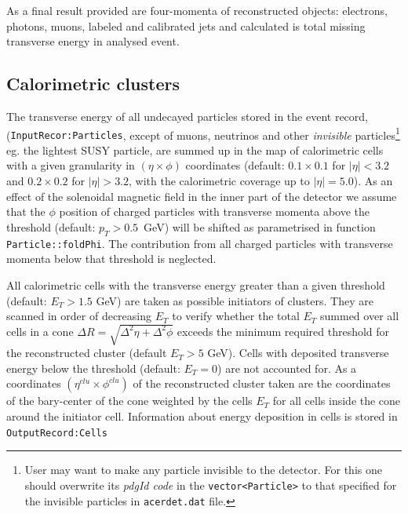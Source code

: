 As a final result provided are four-momenta of reconstructed objects:
electrons, photons, muons, labeled and calibrated jets and calculated is
total missing transverse energy in analysed event.


\boldmath 
\subsection{Calorimetric clusters}
\unboldmath

 The transverse energy of all undecayed particles stored in the event record,\newline
 ({\tt InputRecor:Particles}, except of muons, neutrinos and other 
 {\it invisible} particles\footnote{User may want to make any particle
 invisible to the detector. For this one should overwrite its {\it pdgId code} 
 in the  {\tt vector<Particle>} to that specified for the invisible particles 
 in {\tt acerdet.dat} file.} eg. the lightest SUSY particle,
 are summed up in the map of
 calorimetric cells with a given granularity in $(\eta \times \phi)$
 coordinates (default: $0.1 \times 0.1$ for $|\eta| < 3.2$ and 
 $0.2 \times 0.2$ for  $|\eta| > 3.2$, with the calorimetric coverage
 up to  $|\eta| = 5.0$). As an effect of the solenoidal magnetic field
 in  the inner part of the detector we assume that the $\phi$ position of charged
 particles with transverse momenta above  the threshold 
 (default: $p_T > 0.5$~GeV) will be shifted as parametrised in function
 {\tt  Particle::foldPhi}. The contribution from all charged particles with
 transverse momenta  below that threshold is neglected.

 All calorimetric cells with the transverse energy greater than a
 given threshold (default: $E_T > 1.5$ GeV) are taken as possible
 initiators of clusters. They are scanned in order of decreasing $E_T$
 to verify whether the total $E_T$ summed over all cells in a cone
 $\Delta R = \sqrt{ \Delta^2 \eta + \Delta^2 \phi}$ exceeds the
 minimum required threshold for the reconstructed cluster (default
 $E_T > 5$ GeV). Cells with deposited transverse energy below the
 threshold (default: $E_T=0$) are not accounted for. As a coordinates
 $(\eta^{clu} \times \phi^{clu})$ of the reconstructed cluster
 taken are the coordinates of the bary-center of the cone weighted
 by the cells $E_T$ for all cells inside the cone around the
 initiator cell. Information about energy deposition in cells is stored 
in {\tt OutputRecord:Cells}

